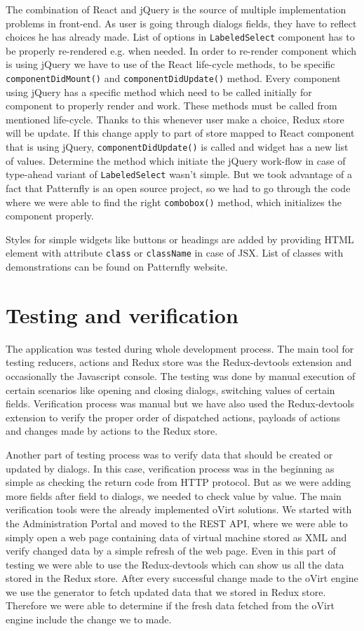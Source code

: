 The combination of React and jQuery is the source of multiple implementation problems in front-end. As user is going through dialogs fields, they have to reflect choices he has already made. List of options in \texttt{LabeledSelect} component has to be properly re-rendered e.g. when needed. In order to re-render component which is using jQuery we have to use of the React life-cycle methods, to be specific \texttt{componentDidMount()} and \texttt{componentDidUpdate()} method. Every component using jQuery has a specific method which need to be called initially for component to properly render and work. These methods must be called from mentioned life-cycle. Thanks to this whenever user make a choice, Redux store will be update. If this change apply to part of store mapped to React component that is using jQuery, \texttt{componentDidUpdate()} is called and widget has a new list of values. 
Determine the method which initiate the jQuery work-flow in case of type-ahead variant of \texttt{LabeledSelect} wasn't simple. But we took advantage of a fact that Patternfly is an open source project, so we had to go through the code where we were able to find the right \texttt{combobox()} method, which initializes the component properly.

Styles for simple widgets like buttons or headings are added by providing HTML element with attribute \texttt{class} or \texttt{className} in case of JSX. List of classes with demonstrations can be found on Patternfly website\cite{Patternfly}. 

\section{Testing and verification}
The application was tested during whole development process. The main tool for testing reducers, actions and Redux store was the Redux-devtools extension and occasionally the Javascript console. The testing was done by manual execution of certain scenarios like opening and closing dialogs, switching values of certain fields. Verification process was manual but we have also used the Redux-devtools extension to verify the proper order of dispatched actions, payloads of actions and changes made by actions to the Redux store.

Another part of testing process was to verify data that should be created or updated by dialogs. In this case, verification process was in the beginning as simple as checking the return code from HTTP protocol. But as we were adding more fields after field to dialogs, we needed to check value by value. The main verification tools were the already implemented oVirt solutions. We started with the Administration Portal and moved  to the REST API, where we were able to simply open a web page containing data of virtual machine stored as XML and verify changed data by a simple refresh of the web page. Even in this part of testing we were able to use the Redux-devtools which can show us all the data stored in the Redux store. After every successful change made to the oVirt engine we use the generator to fetch updated data that we stored in Redux store. Therefore we were able to determine if the fresh data fetched from the oVirt engine include the change we to made.

